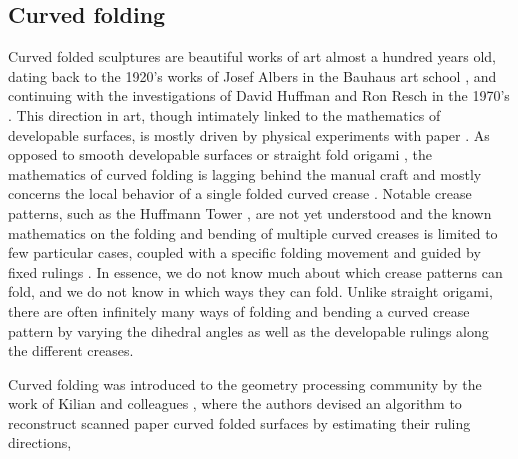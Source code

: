 \subsection{Curved folding}
Curved folded sculptures are beautiful works of art almost a hundred years old, dating back to the 1920's works of Josef Albers in the Bauhaus art school \cite{josef_albers_thesis}, and continuing with the investigations of David Huffman and Ron Resch in the 1970's \cite{huffman,resch1974portfolio}. This direction in art, though intimately linked to the mathematics of developable surfaces, is mostly driven by physical experiments with paper \cite{curved_review}. As opposed to smooth developable surfaces \cite{do_carmo} or straight fold origami \cite{origami_book}, the mathematics of curved folding is lagging behind the manual craft and mostly concerns the local behavior of a single folded curved crease \cite{duncan_folded,mathematical_omnibus,curved_review}. Notable crease patterns, such as the Huffmann Tower \cite{huffman2,huffmann_reconstructing}, are not yet understood \cite{demaine2018conic} and the known mathematics on the folding and bending of multiple curved creases is limited to few particular cases, coupled with a specific folding movement and guided by fixed rulings \cite{demaine_lens, demaine2018conic, mundilova2019mathematical}. In essence, we do not know much about which crease patterns can fold, and we do not know in which ways they can fold. Unlike straight origami, there are often infinitely many ways of folding and bending a curved crease pattern by varying the dihedral angles as well as the developable rulings along the different creases. 

Curved folding was introduced to the geometry processing community by the work of Kilian and colleagues , where the authors devised an algorithm to reconstruct scanned paper curved folded surfaces by estimating their ruling directions, 

